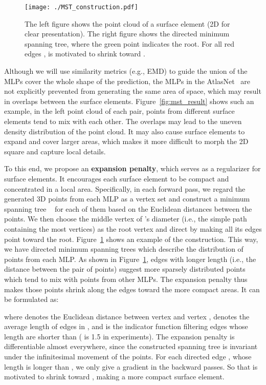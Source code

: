 \documentclass[letterpaper]{article} \usepackage{aaai20}  \usepackage{times}  \usepackage{helvet} \usepackage{courier}  \usepackage[hyphens]{url}  \usepackage{graphicx} \urlstyle{rm} \def\UrlFont{\rm}  \usepackage{graphicx}  \frenchspacing  \setlength{\pdfpagewidth}{8.5in}  \setlength{\pdfpageheight}{11in}  \usepackage{amsmath}
\begin{document}
\begin{figure}[t]
  \centering
  \texttt{[image: ./MST\_construction.pdf]} 
  \caption{The left figure shows the point cloud of a surface element (2D for clear presentation). The right figure shows the directed minimum spanning tree, where the green point indicates the root. For all red edges ,  is motivated to shrink toward .}
  \label{mst_construction}
\end{figure}
Although we will use similarity metrics (e.g., EMD) to guide the union of the MLPs cover the whole shape of the prediction, the MLPs in the AtlasNet~\cite{groueix2018papier} are not explicitly prevented from generating the same area of space, which may result in overlaps between the surface elements. Figure~\ref{fig:mst_result} shows such an example, in the left point cloud of each pair, points from different surface elements tend to mix with each other. The overlaps may lead to the uneven density distribution of the point cloud. It may also cause surface elements to expand and cover larger areas, which makes it more difficult to morph the 2D square and capture local details.

To this end, we propose an \textbf{expansion penalty}, which serves as a regularizer for surface elements. It encourages each surface element to be compact and concentrated in a local area. Specifically, in each forward pass, we regard the generated 3D points from each MLP as a vertex set and construct a minimum spanning tree ~\cite{prim1957shortest} for each of them based on the Euclidean distances between the points. We then choose the middle vertex of 's diameter (i.e., the simple path containing the most vertices) as the root vertex and direct  by making all its edges point toward the root. Figure~\ref{mst_construction} shows an example of the construction. This way, we have  directed minimum spanning trees which describe the distribution of points from each MLP. As shown in Figure~\ref{mst_construction}, edges with longer length (i.e., the distance between the pair of points) suggest more sparsely distributed points which tend to mix with points from other MLPs. The expansion penalty thus makes those points shrink along the edges toward the more compact areas. It can be formulated as: 
{\small

}
where  denotes the Euclidean distance between vertex  and vertex ,  denotes the average length of edges in , and  is the indicator function filtering edges whose length are shorter than  ( is 1.5 in experiments). The expansion penalty is differentiable almost everywhere, since the constructed spanning tree is invariant under the infinitesimal movement of the points. For each directed edge , whose length is longer than , we only give  a gradient in the backward passes. So that  is motivated to shrink toward , making a more compact surface element. 
\end{document}
